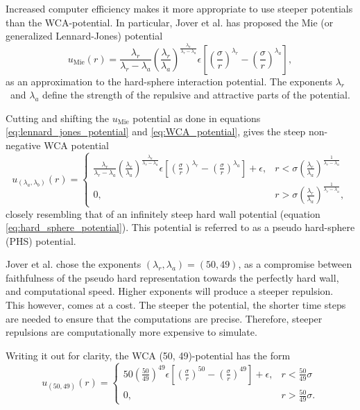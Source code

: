 Increased computer efficiency makes it more appropriate 
to use steeper potentials than the WCA-potential.
In particular, Jover et al. \cite{ref:jover:pseudo_hard} 
has proposed the Mie (or generalized Lennard-Jones) potential
\[
    u_{\text{Mie}}(r) = 
        \frac{\lambda_r}{\lambda_r - \lambda_a}
        \left(\frac{\lambda_r}{\lambda_a}\right)
        ^{\frac{\lambda_a}{\lambda_r - \lambda_a}}
        \epsilon \left[
            \left(\frac{\sigma}{r}\right)^{\lambda_r} -
            \left(\frac{\sigma}{r}\right)^{\lambda_a}
        \right],
\]
as an approximation to the hard-sphere interaction potential.
The exponents $\lambda_r$ and $\lambda_a$ define the strength 
of the repulsive and attractive parts of the potential.

Cutting and shifting the $u_{\text{Mie}}$ 
potential as done in equations
\eqref{eq:lennard_jones_potential} 
and \eqref{eq:WCA_potential}, gives 
the steep non-negative WCA potential 
\[
    u_{(\lambda_a, \lambda_b)}(r) = 
    \begin{cases}
        \frac{\lambda_r}{\lambda_r - \lambda_a}
        \left(\frac{\lambda_r}{\lambda_a}\right)
        ^{\frac{\lambda_a}{\lambda_r - \lambda_a}}
        \epsilon \left[
            \left(\frac{\sigma}{r}\right)^{\lambda_r} -
            \left(\frac{\sigma}{r}\right)^{\lambda_a}
        \right]
        + \epsilon,
            & r < \sigma \left(
                \frac{\lambda_r}{\lambda_a}
            \right)^\frac{1}{\lambda_r - \lambda_a} \\
        0,  & r > \sigma \left(
                \frac{\lambda_r}{\lambda_a}
            \right)^\frac{1}{\lambda_r - \lambda_a},
    \end{cases}
\]
closely resembling that of an infinitely steep hard 
wall potential (equation \eqref{eq:hard_sphere_potential}).
This potential is referred to as a pseudo hard-sphere 
(PHS) potential.

Jover et al. chose the exponents \((\lambda_r, \lambda_a) = (50, 49)\), 
as a compromise between faithfulness of the pseudo 
hard representation towards the perfectly hard 
wall, and computational speed. Higher exponents 
will produce a steeper repulsion. This however, 
comes at a cost.  The steeper the potential, the 
shorter time steps are needed to ensure that the 
computations are precise. %
Therefore, steeper repulsions are computationally 
more expensive to simulate.

Writing it out for clarity, the WCA 
(50, 49)-potential has the form
\[
    u_{(50, 49)}(r) = 
    \begin{cases}
        50
        \left(\frac{50}{49}\right)^{49}
        \epsilon \left[
            \left(\frac{\sigma}{r}\right)^{50} -
            \left(\frac{\sigma}{r}\right)^{49}
        \right]
        + \epsilon,
            & r < \frac{50}{49} \sigma\\
        0,  & r > \frac{50}{49} \sigma.
    \end{cases}
\]

